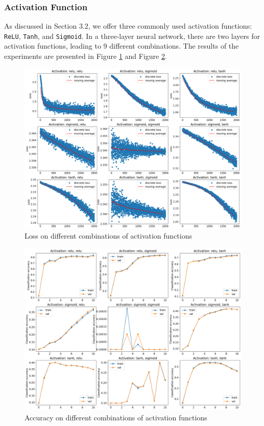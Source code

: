 \documentclass[10pt,a4paper,twoside]{tau}
\begin{document}
\subsubsection{Activation Function}

As discussed in Section 3.2, we offer three commonly used activation functions: \texttt{ReLU}, \texttt{Tanh}, and \texttt{Sigmoid}. In a three-layer neural network, there are two layers for activation functions, leading to 9 different combinations. The results of the experiments are presented in Figure \ref{fig:activation-loss} and Figure \ref{fig:activation-acc}.


\begin{figure}[htbp]
    \centering
    \includegraphics[scale=0.2]{images/activation_loss.png}
    \caption{Loss on different combinations of activation functions}
    \label{fig:activation-loss}
\end{figure}

\begin{figure}[htbp]
    \centering
    \includegraphics[scale=0.2]{images/activation_acc.png}
    \caption{Accuracy on different combinations of activation functions}
    \label{fig:activation-acc}
\end{figure}
\end{document}
